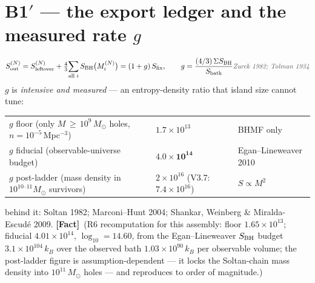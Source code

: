 \documentclass[11pt]{article}
\newcommand{\Fact}{\textbf{\textcolor{green!45!black}{[Fact]}}}
\newcommand{\own}[1]{\hfill{\small\textcolor{gray!70!black}{\textit{#1}}}}
\begin{document}
\section{B1$'$ --- the export ledger and the measured rate $g$}
\begin{equation}
S_{\rm out}^{(N)}=S_{\rm leftover}^{(N)}+\tfrac43\!\sum_{\text{all }i}S_{\rm BH}\bigl(M_i^{(N)}\bigr)=(1+g)\,S_{\rm fix},
\qquad g=\frac{(4/3)\,\Sigma S_{\rm BH}}{S_{\rm bath}}
\own{Zurek 1982; Tolman 1934}
\label{eq:b1export}
\end{equation}
$g$ is \emph{intensive and measured} --- an entropy-density ratio that island size cannot tune:
\begin{center}\small
\begin{tabular}{lll}\toprule
$g$ floor (only $M\,{\ge}\,10^9\,M_\odot$ holes, $n=10^{-5}\,$Mpc$^{-3}$) & $1.7\times10^{13}$ & BHMF only\\
$g$ fiducial (observable-universe budget) & $\mathbf{4.0\times10^{14}}$ & Egan--Lineweaver 2010\\
$g$ post-ladder (mass density in $10^{10\text{--}11}M_\odot$ survivors) & $2\times10^{16}$ (V3.7: $7.4\times10^{16}$) & $S\propto M^2$\\\bottomrule
\end{tabular}\end{center}
behind it: Soltan 1982; Marconi--Hunt 2004; Shankar, Weinberg \& Miralda-Escud\'e 2009. \Fact\ (R6 recomputation for this assembly: floor $1.65\times10^{13}$; fiducial $4.01\times10^{14}$, $\log_{10}=14.60$, from the Egan--Lineweaver $S_{\rm BH}$ budget $3.1\times10^{104}\,k_B$ over the observed bath $1.03\times10^{90}\,k_B$ per observable volume; the post-ladder figure is assumption-dependent --- it locks the Soltan-chain mass density into $10^{11}\,M_\odot$ holes --- and reproduces to order of magnitude.)

\end{document}
